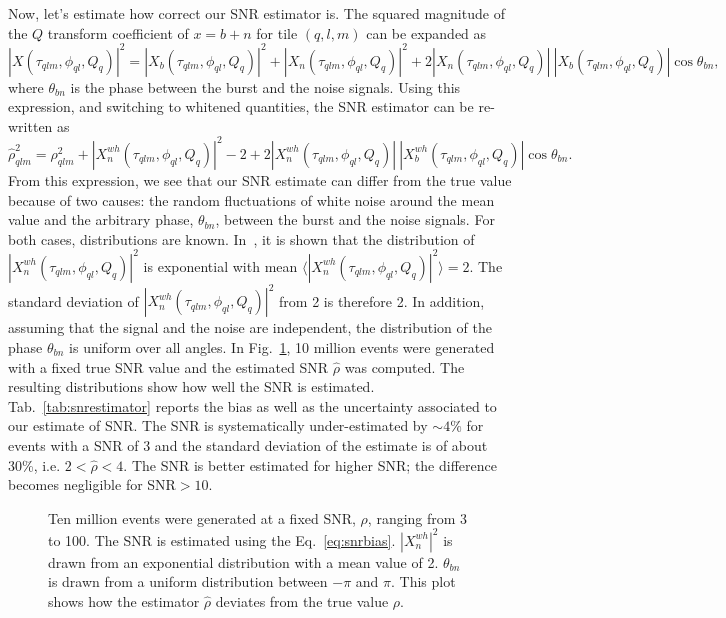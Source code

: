 Now, let's estimate how correct our SNR estimator is. The squared magnitude of the $Q$ transform coefficient of $x=b+n$ for tile $(q,l,m)$ can be expanded as
\begin{equation}
  |X(\tau_{qlm}, \phi_{ql}, Q_q)|^2 = |X_b(\tau_{qlm}, \phi_{ql}, Q_q)|^2 + |X_n(\tau_{qlm}, \phi_{ql}, Q_q)|^2 + 2|X_n(\tau_{qlm}, \phi_{ql}, Q_q)|\ |X_b(\tau_{qlm}, \phi_{ql}, Q_q)|\cos{\theta_{bn}},
\end{equation}
where $\theta_{bn}$ is the phase between the burst and the noise signals. Using this expression, and switching to whitened quantities, the SNR estimator can be re-written as
\begin{equation}
  \hat{\rho}_{qlm}^2  =
  \rho_{qlm}^2
  + |X^{wh}_n(\tau_{qlm}, \phi_{ql}, Q_q)|^2 - 2
  + 2|X^{wh}_n(\tau_{qlm}, \phi_{ql}, Q_q)|\ |X^{wh}_b(\tau_{qlm}, \phi_{ql}, Q_q)| \cos{\theta_{bn}}.
  \label{eq:snrbias}
\end{equation}
From this expression, we see that our SNR estimate can differ from the true value because of two causes: the random fluctuations of white noise around the mean value and the arbitrary phase, $\theta_{bn}$, between the burst and the noise signals. For both cases, distributions are known. In~\cite{Chatterji:2004}, it is shown that the distribution of $|X^{wh}_n(\tau_{qlm}, \phi_{ql}, Q_q)|^2$ is exponential with mean $\langle |X^{wh}_n(\tau_{qlm}, \phi_{ql}, Q_q)|^2 \rangle = 2$. The standard deviation of $|X^{wh}_n(\tau_{qlm}, \phi_{ql}, Q_q)|^2$ from 2 is therefore 2. In addition, assuming that the signal and the noise are independent, the distribution of the phase $\theta_{bn}$ is uniform over all angles. In Fig.~\ref{fig:snrestimator}, 10 million events were generated with a fixed true SNR value and the estimated SNR $\hat{\rho}$ was computed. The resulting distributions show how well the SNR is estimated. Tab.~\ref{tab:snrestimator} reports the bias as well as the uncertainty associated to our estimate of SNR. The SNR is systematically under-estimated by $\sim 4\%$ for events with a SNR of 3 and the standard deviation of the estimate is of about 30\%, i.e. $2<\hat{\rho}<4$. The SNR is better estimated for higher SNR; the difference becomes negligible for SNR$>10$.
\begin{figure}
  \center
  \caption{Ten million events were generated at a fixed SNR, $\rho$, ranging from 3 to 100. The SNR is estimated using the Eq.~\ref{eq:snrbias}. $|X^{wh}_n|^2$ is drawn from an exponential distribution with a mean value of 2. $\theta_{bn}$ is drawn from a uniform distribution between $-\pi$ and $\pi$. This plot shows how the estimator $\hat{\rho}$ deviates from the true value $\rho$.}
  \label{fig:snrestimator}
\end{figure}
